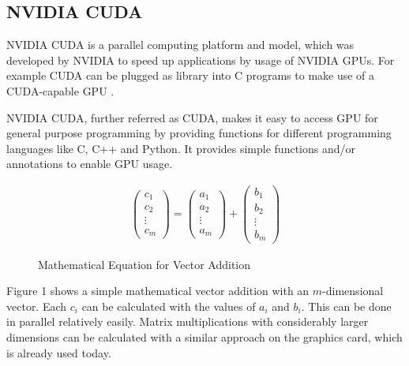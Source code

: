 \documentclass[conference]{IEEEtran}
\begin{document}
			
			
	\subsection{NVIDIA CUDA}

		
		
		NVIDIA CUDA is a parallel computing platform and model, which was developed by NVIDIA to speed up applications by usage of NVIDIA GPUs. For example CUDA can be plugged as library into C programs to make use of a CUDA-capable GPU .
		
		NVIDIA CUDA, further referred as CUDA, makes it easy to access GPU for general purpose programming by providing functions for different programming languages like C, C++ and Python. It provides simple functions and/or annotations to enable GPU usage. 
	
			
		\begin{figure}[htbp] 
			\begin{align*}
			\begin{pmatrix}
			c_{1} \\
			c_{2} \\
			\vdots \\
			c_{m}
			\end{pmatrix} 
			= 
			\begin{pmatrix}
			a_{1} \\
			a_{2} \\
			\vdots \\
			a_{m}
			\end{pmatrix}
			+ 
			\begin{pmatrix}
			b_{1} \\
			b_{2} \\
			\vdots \\
			b_{m}
			\end{pmatrix}			
			\end{align*}
			\caption{Mathematical Equation for Vector Addition}
		\end{figure}
	
		
	
		
		Figure 1 shows a simple mathematical vector addition with an $m$-dimensional vector. Each $c_i$ can be calculated with the values of $a_i$ and $b_i$. This can be done in parallel relatively easily. Matrix multiplications with considerably larger dimensions can be calculated with a similar approach on the graphics card, which is already used today.
		
\end{document}
